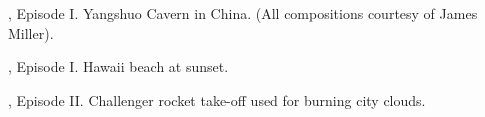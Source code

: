 \begin{minipage}{\textwidth}
\par \vspace{5pt}
\doom{}, Episode I. Yangshuo Cavern in China. (All compositions courtesy of James Miller).\\
\par
{}
\end{minipage}
\par






\begin{minipage}{\textwidth}
\par \vspace{5pt}
\doomii{}, Episode I. Hawaii beach at sunset.\\
\par
{}
\end{minipage}


\begin{minipage}{\textwidth}
\par \vspace{5pt}
\doomii{}, Episode II. Challenger rocket take-off used for burning city clouds.\\
\par
{}
\end{minipage}







